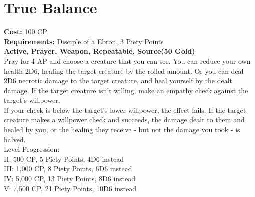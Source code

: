 \section{True Balance}\label{prayer:trueBalance}
\textbf{Cost:} 100 CP\\
\textbf{Requirements:} Disciple of a Ebron, 3 Piety Points \\
\textbf{Active, Prayer, Weapon, Repeatable, Source(50 Gold)}\\
Pray for 4 AP and choose a creature that you can see.
You can reduce your own health 2D6, healing the target creature by the rolled amount.
Or you can deal 2D6 necrotic damage to the target creature, and heal yourself by the dealt damage.
If the target creature isn't willing, make an empathy check against the target's willpower.\\
If your check is below the target's lower willpower, the effect fails.
If the target creature makes a willpower check and succeeds, the damage dealt to them and healed by you, or the healing they receive - but not the damage you took - is halved.
\\
Level Progression:\\
II: 500 CP, 5 Piety Points, 4D6 instead\\
III: 1,000 CP, 8 Piety Points, 6D6 instead\\
IV: 5,000 CP, 13 Piety Points, 8D6 instead\\
V: 7,500 CP, 21 Piety Points, 10D6 instead\\